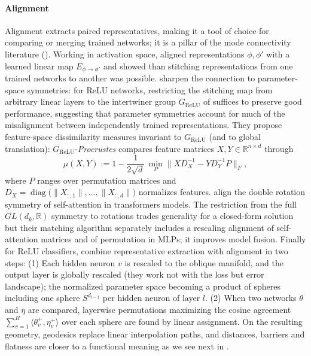 \documentclass[mathematics,review,submit,moreauthors]{Definitions/mdpi}
\begin{document}
\paragraph{Alignment}
Alignment extracts paired representatives, making it a tool of choice for comparing or merging trained networks; it is a pillar of the mode connectivity literature ().
Working in activation space, \citet{lenc2014a} aligned representations $\phi,\phi'$ with a learned linear map $E_{\phi\to\phi'}$ and showed than stitching representations from one trained networks to another was possible.
\citet{godfrey2022} sharpen the connection to parameter-space symmetries: for ReLU networks, restricting the stitching map from arbitrary linear layers to the intertwiner group $G_{\mathrm{ReLU}}$ of  suffices to preserve good performance, suggesting that parameter symmetries account for much of the misalignment between independently trained representations.
They propose feature-space dissimilarity measures invariant to $G_{\mathrm{ReLU}}$ (and to global translation): $G_{\mathrm{ReLU}}$-\emph{Procrustes} compares feature matrices $X,Y\in\mathbb{R}^{n\times d}$ through
\begin{equation*}
    \mu(X,Y):=1-\frac{1}{2\sqrt{d}}\,\min_{P}\big\lVert XD_X^{-1}-YD_Y^{-1}P\big\rVert_F,
\end{equation*}
where $P$ ranges over permutation matrices and $D_X=\operatorname{diag}\big(\lVert X_{:,1}\rVert,\dots,\lVert X_{:,d}\rVert\big)$ normalizes features.
\citet{zhang2025p4icml} align the double rotation symmetry of self-attention in transformers models.
The restriction from the full $GL(d_k,\mathbb{R})$ symmetry to rotations trades generality for a closed-form solution but their matching algorithm separately includes a rescaling alignment of self-attention matrices and of permutation in MLPs; it improves model fusion.
Finally for ReLU classifiers, \citet{pittorino2022jsm} combine representative extraction with alignment in two steps:
(1) Each hidden neuron $v$ is rescaled to the oblique manifold, and the output layer is globally rescaled (they work not with the loss but error landscape); the normalized parameter space becoming a product of spheres including one sphere $S^{d_{l-1}}$ per hidden neuron of layer $l$.
(2) When two networks $\theta$ and $\eta$ are compared, layerwise permutations maximizing the cosine agreement $\sum_{v=1}^{H}\langle\theta_v^{+},\eta_v^{+}\rangle$ over each sphere are found by linear assignment.
On the resulting geometry, geodesics replace linear interpolation paths, and distances, barriers and flatness are closer to a functional meaning as we see next in  .
\end{document}
